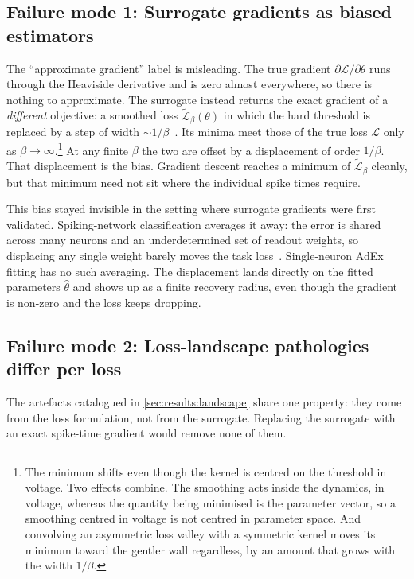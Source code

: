 \subsection{Failure mode 1: Surrogate gradients as biased estimators}\label{sec:discussion:bias}

The ``approximate gradient'' label is misleading.
The true gradient $\partial\mathcal{L}/\partial\theta$ runs through the Heaviside derivative and is zero almost everywhere, so there is nothing to approximate.
The surrogate instead returns the exact gradient of a \emph{different} objective: a smoothed loss $\widetilde{\mathcal{L}}_\beta(\theta)$ in which the hard threshold is replaced by a step of width $\sim 1/\beta$~\cite{Gygax2025}.
Its minima meet those of the true loss $\mathcal{L}$ only as $\beta\to\infty$.\footnote{The minimum shifts even though the kernel is centred on the threshold in voltage. Two effects combine. The smoothing acts inside the dynamics, in voltage, whereas the quantity being minimised is the parameter vector, so a smoothing centred in voltage is not centred in parameter space. And convolving an asymmetric loss valley with a symmetric kernel moves its minimum toward the gentler wall regardless, by an amount that grows with the width $1/\beta$.}
At any finite $\beta$ the two are offset by a displacement of order $1/\beta$.
That displacement is the bias.
Gradient descent reaches a minimum of $\widetilde{\mathcal{L}}_\beta$ cleanly, but that minimum need not sit where the individual spike times require.

This bias stayed invisible in the setting where surrogate gradients were first validated.
Spiking-network classification averages it away: the error is shared across many neurons and an underdetermined set of readout weights, so displacing any single weight barely moves the task loss~\cite{Neftci2019,Zenke2018,Perez-Nieves2021}.
Single-neuron \gls{AdEx} fitting has no such averaging.
The displacement lands directly on the fitted parameters $\hat\theta$ and shows up as a finite recovery radius, even though the gradient is non-zero and the loss keeps dropping.

\subsection{Failure mode 2: Loss-landscape pathologies differ per loss}\label{sec:discussion:landscape-fm}

The artefacts catalogued in \cref{sec:results:landscape} share one property: they come from the loss formulation, not from the surrogate.
Replacing the surrogate with an exact spike-time gradient would remove none of them.

